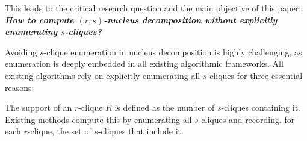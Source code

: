 

This leads to the critical research question and the main objective of this paper: \textbf{\textit{How to compute $(r,s)$-nucleus decomposition without explicitly enumerating $s$-cliques?}}

Avoiding $s$-clique enumeration in nucleus decomposition is highly challenging, as enumeration is deeply embedded in all existing algorithmic frameworks.
%
All existing algorithms rely on explicitly enumerating all $s$-cliques for three essential reasons:



%
The support of an $r$-clique $R$ is defined as the number of $s$-cliques containing it. 
Existing methods compute this by enumerating all $s$-cliques and recording, for each $r$-clique, the set of $s$-cliques that include it.

